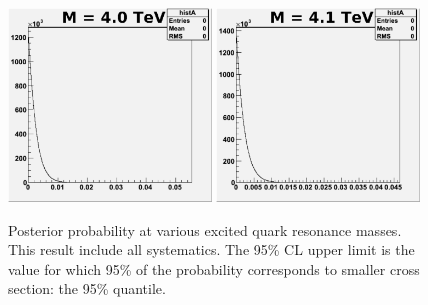 \begin{figure}[!ht]
  \begin{center}
     \includegraphics[width=0.48\textwidth]{Figures/MCpost4000_6_pe0.pdf}
     \includegraphics[width=0.48\textwidth]{Figures/MCpost4100_6_pe0.pdf}
 \caption{Posterior probability at
 various excited quark resonance masses. This result include all systematics.
 The 95\% CL upper limit is the value for which 95\% of
 the probability corresponds to smaller cross section: the 95\% quantile.}
    \label{likeli6}
  \end{center}
\end{figure}

\clearpage

